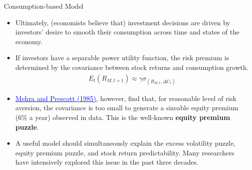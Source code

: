 \documentclass{beamer}
\begin{document}
\begin{frame}{Consumption-based Model}
	\begin{itemize}
		\item Ultimately, (economists believe that) investment decisions are driven by investors' desire to smooth their consumption across time and states of the economy.
		\item If investors have a separable power utility function, the risk premium is determined by the covariance between stock returns and consumption growth.
		\begin{align*}
			E_{t}\left(R_{M, t+1}\right) \approx \gamma \sigma_{(R_{M,t}, \Delta C_{t})}
		\end{align*}
		\item \href{https://www.sciencedirect.com/science/article/pii/0304393285900613}{\textcolor{blue}{Mehra and Prescott (1985)}}, however, find that, for reasonable level of risk
			aversion, the covariance is too small to generate a sizeable equity premium (6\% a
			year) observed in data. This is the well-known \textbf{equity premium puzzle}.
		\item A useful model should simultaneously explain the excess volatility puzzle, equity
		premium puzzle, and stock return predictability. Many researchers have intensively
		explored this issue in the past three decades.
	\end{itemize}
\end{frame}
\end{document}
